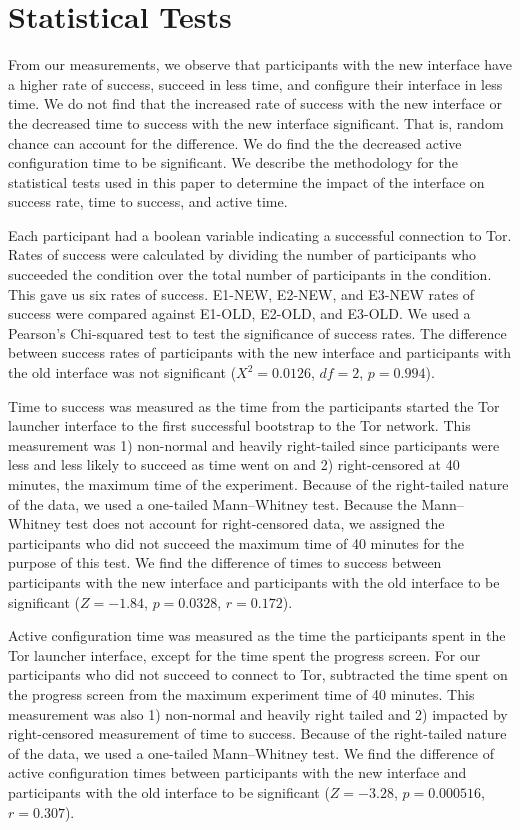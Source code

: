 \documentclass[USenglish,oneside,twocolumn]{article}
\begin{document}
\section{Statistical Tests} 
\label{stat-tests}
{\color {red} 
From our measurements, we observe that participants with the new interface 
have a higher rate of success, succeed in less time, and configure their interface in less time. 
We do not find that the increased rate of success with the new interface or the decreased time to success with the new interface significant. That is, random chance can account for the difference. 
We do find the the decreased active configuration time to be significant. 
We describe the methodology for the statistical tests used in this paper to determine the impact of the interface on success rate, time to success, and active time. 

Each participant had a boolean variable indicating a successful connection to Tor. Rates of success were calculated by dividing the number of participants who succeeded the condition over the total number of participants in the condition. This gave us six rates of success. E1-NEW, E2-NEW, and E3-NEW rates of success were compared against E1-OLD, E2-OLD, and E3-OLD.  We used a Pearson's Chi-squared test to test the significance of success rates. The difference between success rates of participants with the new interface and participants with the old interface was not significant ($X^2 = 0.0126$, $df = 2$, $p = 0.994$).

Time to success was measured as the time from the participants started the Tor launcher interface to the first successful bootstrap to the Tor network. This measurement was 1) non-normal and heavily right-tailed since participants were less and less likely to succeed as time went on and 2) right-censored at 40 minutes, the maximum time of the experiment. Because of the right-tailed nature of the data, we used a one-tailed Mann--Whitney test. Because the Mann--Whitney test does not account for right-censored data, we assigned the participants who did not succeed the maximum time of 40 minutes for the purpose of this test. We find the difference of times to success between participants with the new interface and participants with the old interface to be significant ($ Z = -1.84$, $p = 0.0328$, $r= 0.172$). 

Active configuration time was measured as the time the participants spent in the Tor launcher interface, except for the time spent the progress screen. For our participants who did not succeed to connect to Tor, subtracted the time spent on the progress screen from the maximum experiment time of 40 minutes. This measurement was also 1) non-normal and heavily right tailed and 2) impacted by right-censored measurement of time to success. Because of the right-tailed nature of the data, we used a one-tailed Mann--Whitney test. We find the difference of active configuration times between participants with the new interface and participants with the old interface to be significant ($Z = -3.28$, $p = 0.000516$, $r = 0.307$).
}
\end{document}
